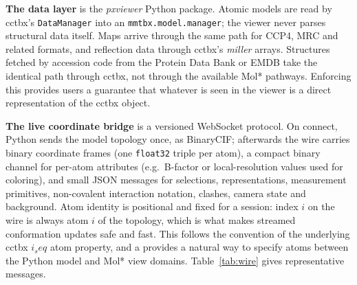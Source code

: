 \documentclass[11pt]{article}
\newcommand{\pxviewer}{\emph{pxviewer}}
\begin{document}
\textbf{The data layer} is the \pxviewer{} Python package. Atomic models are
read by cctbx's \texttt{DataManager} into an \texttt{mmtbx.model.manager};
the viewer never parses structural data itself. Maps arrive through the same
path for CCP4, MRC and related formats, and reflection data through cctbx's
\emph{miller} arrays. Structures fetched by accession code from the Protein Data Bank
or EMDB take the identical path through cctbx, not through the available Mol* pathways. 
Enforcing this provides users a guarantee that whatever is seen in the viewer is a direct representation of 
the cctbx object.

\textbf{The live coordinate bridge} is a versioned WebSocket protocol. On
connect, Python sends the model topology once, as BinaryCIF; afterwards the
wire carries binary coordinate frames (one \texttt{float32} triple per atom),
a compact binary channel for per-atom attributes (e.g.\ B-factor or
local-resolution values used for coloring), and small JSON messages for
selections, representations, measurement primitives, non-covalent
interaction notation, clashes, camera state and background. Atom identity is
positional and fixed for a session: index $i$ on the wire is always atom
$i$ of the topology, which is what makes streamed conformation updates safe and fast.
This follows the convention of the underlying cctbx $i_seq$ atom property, and a provides a 
natural way to specify atoms between the Python model and Mol* view domains.
Table~\ref{tab:wire} gives representative messages.
\end{document}
